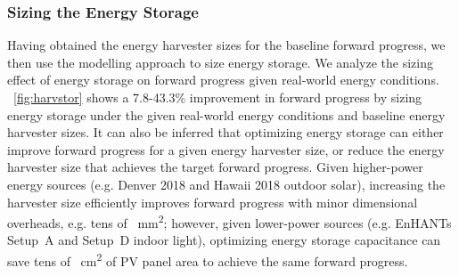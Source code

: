 \subsubsection{Sizing the Energy Storage}

Having obtained the energy harvester sizes for the baseline forward progress, we then use the modelling approach to size energy storage.
We analyze the sizing effect of energy storage on forward progress given real-world energy conditions. \figurename{~\ref{fig:harvstor}} shows a 7.8-43.3\% improvement in forward progress by sizing energy storage under the given real-world energy conditions and baseline energy harvester sizes. 
It can also be inferred that optimizing energy storage can either improve forward progress for a given energy harvester size, or reduce the energy harvester size that achieves the target forward progress. Given higher-power energy sources (e.g. Denver 2018 and Hawaii 2018 outdoor solar), increasing the harvester size efficiently improves forward progress with minor dimensional overheads, e.g. tens of \SI{}{\square\milli\meter}; however, given lower-power sources (e.g. EnHANTs Setup~A and Setup~D indoor light), optimizing energy storage capacitance can save tens of \SI{}{\square\centi\meter} of PV panel area to achieve the same forward progress.



